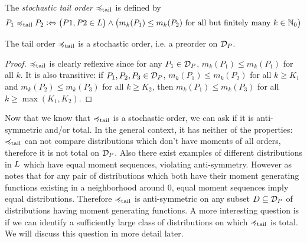 \documentclass[a4paper]{scrreprt}
\begin{document}
    \begin{defn}[Stochastic Tail Order]
        The \emph{stochastic tail order} $\preccurlyeq_{\text{tail}}$ is defined by
        \begin{gather*}
            P_1 \preccurlyeq_{\text{tail}} P_2 \mathrel{\vcentcolon\Leftrightarrow} \bigl(P1, P2 \in L\bigr) \wedge \bigl(m_k(P_1) \leq m_k(P_2) \text{ for all but finitely many $k \in \mathbb{N}_0$}\bigr)
        \end{gather*}
    \end{defn}

    \begin{lemma}
        The tail order $\preccurlyeq_{\text{tail}}$ is a stochastic order, i.e. a preorder on $\mathcal{D}_P$.
    \end{lemma}
    \begin{proof}
        $\preccurlyeq_{\text{tail}}$ is clearly reflexive since for any $P_1 \in \mathcal{D}_P$, $m_k(P_1) \leq m_k(P_1)$ for all $k$.
        It is also transitive: if $P_1, P_2, P_3 \in \mathcal{D}_P$, $m_k(P_1) \leq m_k(P_2)$ for all $k \geq K_1$ and $m_k(P_2) \leq m_k(P_3)$ for all $k \geq K_2$, then $m_k(P_1) \leq m_k(P_3)$ for all $k \geq \max(K_1, K_2)$.
    \end{proof}
    
    Now that we know that $\preccurlyeq_{\text{tail}}$ is a stochastic order, we can ask if it is anti-symmetric and/or total.
    In the general context, it has neither of the properties: $\preccurlyeq_{\text{tail}}$ can not compare distributions which don't have moments of all orders, therefore it is not total on $\mathcal{D}_P$.
    Also there exist examples of different distributions in $L$ which have equal moment sequences, violating anti-symmetry. However as \cite{bib:rassGameRiskManagI} notes that for any pair of distributions which both have their moment generating functions existing in a neighborhood around 0, equal moment sequences imply equal distributions.
    Therefore $\preccurlyeq_{\text{tail}}$ is anti-symmetric on any subset $D \subseteq \mathcal{D}_P$ of distributions having moment generating functions.
    A more interesting question is if we can identify a sufficiently large class of distributions on which $\preccurlyeq_{\text{tail}}$ is total. We will discuss this question in more detail later.
    
\end{document}
